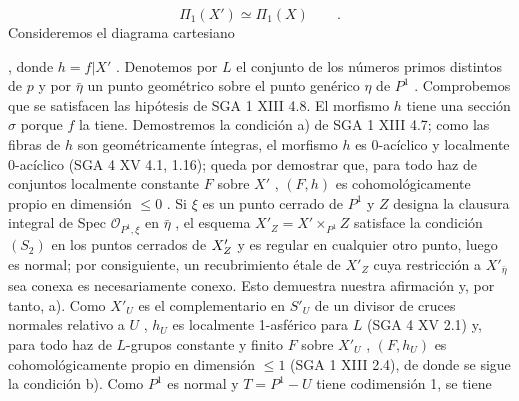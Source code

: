 \begin{equation*}
\Pi_1(X') \simeq \Pi_1(X) \qquad .
\end{equation*}
Consideremos el diagrama cartesiano

\qquad ,
donde $h = f|X'$ . Denotemos por $L$ el conjunto de los números primos distintos de $p$ y por $\bar{\eta}$ un punto geométrico sobre el punto genérico $\eta$ de $P^1$ . Comprobemos que se satisfacen las hipótesis de SGA 1 XIII 4.8. El morfismo $h$ tiene una sección $\sigma$ porque $f$ la tiene. Demostremos la condición a) de SGA 1 XIII 4.7; como las fibras de $h$ son geométricamente íntegras, el morfismo $h$ es 0-acíclico y localmente 0-acíclico (SGA 4 XV 4.1, 1.16); queda por demostrar que, para todo haz de conjuntos localmente constante $F$ sobre $X'$ , $(F,h)$ es cohomológicamente propio en dimensión $\leqslant 0$ . Si $\xi$ es un punto cerrado de $P^1$ y $Z$ designa la clausura integral de Spec $\mathcal{O}_{P^1,\xi}$ en $\bar{\eta}$ , el esquema $X'_Z = X'\times_{P^1} Z$ satisface la condición $(S_2)$ en los puntos cerrados de $\sisi{X'}{X'_Z}$ y es regular en cualquier otro punto, luego es normal; por consiguiente, un recubrimiento étale de $X'_Z$ cuya restricción a $X'_{\bar{\eta}}$ sea conexa es necesariamente conexo. Esto demuestra nuestra afirmación y, por tanto, a). Como $X'_U$ es el complementario en $S'_U$ de un divisor de cruces normales relativo a $U$ , $h_U$ es localmente 1-asférico para $L$ (SGA 4 XV 2.1) y, para todo haz de $L$-grupos constante y finito $F$ sobre $X'_U$ , $(F,h_U)$ es cohomológicamente propio en dimensión $\leqslant 1$ (SGA 1 XIII 2.4), de donde se sigue la condición b). Como $P^1$ es normal y $T = P^1 - U$ tiene
codimensión 1, se tiene

